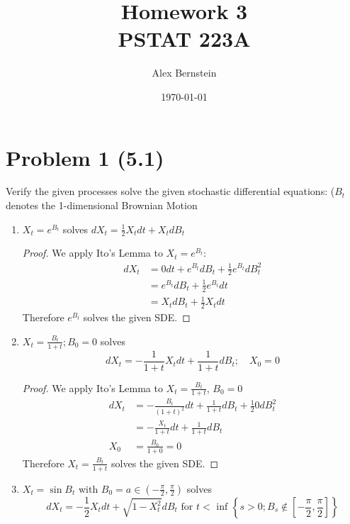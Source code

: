 \documentclass[11pt]{article}
\date{\today}
\begin{document}
\title{Homework 3 \\ \large PSTAT 223A \vspace{-2ex}}
\author{Alex Bernstein \vspace{-2ex}}
\maketitle
 \section*{Problem 1 (5.1)}
Verify the given processes solve the given stochastic differential equations: ($B_t$ denotes the 1-dimensional Brownian Motion
\begin{enumerate}
\item $X _ { t } = e ^ { B _ { t } }$ solves $d X _ { t } = \frac { 1 } { 2 } X _ { t } d t + X _ { t } d B _ { t }$
\begin{proof}
We apply Ito's Lemma to $X_t=e^{B_t}$:
\begin{align*}
dX_t &= 0 dt + e^{B_t} dB_t + \frac{1}{2} e^{B_t}dB_t^2\\
&= e^{B_t} dB_t + \frac{1}{2}e^{B_t} dt\\
&= X_t dB_t + \frac{1}{2}X_t dt
\end{align*}
Therefore $e^{B_t}$ solves the given SDE.
\end{proof}
\item $X _ { t } = \frac { B _ { t } } { 1 + t } ; B _ { 0 } = 0$ solves $$
d X _ { t } = - \frac { 1 } { 1 + t } X _ { t } d t + \frac { 1 } { 1 + t } d B _ { t } ; \quad X _ { 0 } = 0 $$
\begin{proof}
We apply Ito's Lemma to $X_t = \frac{B_t}{1+t}$,  $B_0=0$
\begin{align*}
dX_t &= -\frac{B_t}{(1+t)^2} dt + \frac{1}{1+t}dB_t + \frac{1}{2} 0 dB_t^2\\
&= -\frac{X_t}{1+t} dt + \frac{1}{1+t}dB_t\\
X_0&= \frac{B_0}{1+0}= 0
\end{align*}
Therefore $X_t= \frac{B_t}{1+t}$ solves the given SDE.
\end{proof}
\item $X _ { t } = \sin B _ { t }$ with $B _ { 0 } = a \in \left( - \frac { \pi } { 2 } , \frac { \pi } { 2 } \right)$ solves $$
d X _ { t } = - \frac { 1 } { 2 } X _ { t } d t + \sqrt { 1 - X _ { t } ^ { 2 } }d B _ { t } \text { for } t < \text { inf } \left\{ s > 0 ; B _ { s } \notin \left[ - \frac { \pi } { 2 } , \frac { \pi } { 2 } \right] \right\} $$

\end{enumerate}
\end{document}
